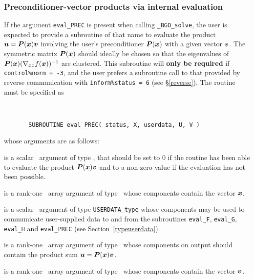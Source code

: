 \documentclass{galahad}
\newcommand{\packagename}{BGO}
\newcommand{\fullpackagename}{\libraryname\_\packagename}
\newcommand{\solver}{{\tt \fullpackagename\_solve}}
\begin{document}

\subsubsection{Preconditioner-vector products via internal evaluation\label{pv}}

If the argument {\tt eval\_PREC} is present when calling \solver, the
user is expected to provide a subroutine of that name to evaluate the
product ${\bm{u}} = {\bm{P}}({\bm{x}}) {\bm{v}}$ involving the user's preconditioner
${\bm{P}}({\bm{x}})$ with a given vector ${\bm{v}}$. The symmetric matrix ${\bm{P}}({\bm{x}})$
should ideally be chosen so that the eigenvalues of
${\bm{P}}({\bm{x}}) (\nabla_{xx} f({\bm{x}}))^{-1}$ are clustered. This subroutine
will {\bf only be required} if {\tt control\%norm = -3}, and the user prefers
a subroutine call to that provided by reverse communication 
with {\tt inform\%status = 6} (see \S\ref{reverse}).
The routine must be specified as

\def\baselinestretch{0.8}
{\tt
\begin{verbatim}
       SUBROUTINE eval_PREC( status, X, userdata, U, V )
\end{verbatim} }
\def\baselinestretch{1.0}
\noindent whose arguments are as follows:

\begin{description}
 is a scalar \intentout\ argument of type \integer,
that should be set to 0 if the routine has been able to evaluate the
product ${\bm{P}}({\bm{x}}) {\bm{v}}$
and to a non-zero value if the evaluation has not been possible.

 is a rank-one \intentin\ array argument of type \realdp\
whose components contain the vector ${\bm{x}}$.

 is a scalar \intentinout\ argument of type
{\tt USERDATA\_type} whose components may be used
to communicate user-supplied data to and from the
subroutines {\tt eval\_F}, {\tt eval\_G},
{\tt eval\_H} and {\tt eval\_PREC}
(see Section~\ref{typeuserdata}).

 is a rank-one \intentout\ array argument of type \realdp\
whose components on output should contain the product
sum ${\bm{u}} = {\bm{P}}({\bm{x}}) {\bm{v}}$.

 is a rank-one \intentin\ array argument of type \realdp\
whose components contain the vector ${\bm{v}}$.

\end{description}
\end{document}
